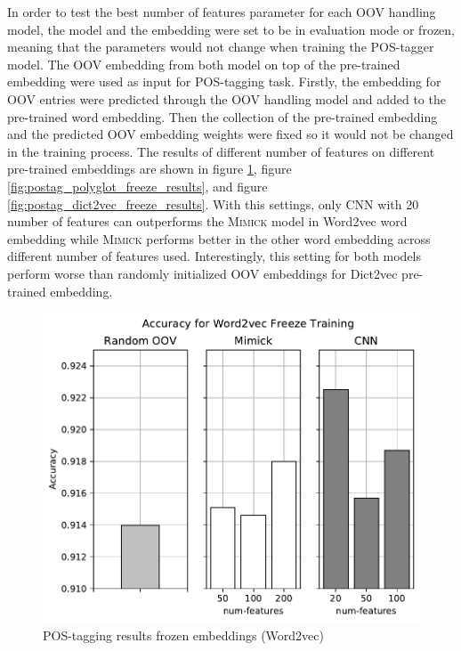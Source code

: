       In order to test the best number of features parameter for each
      OOV handling model, the model and the embedding were set to be
      in evaluation mode or frozen, meaning that the parameters would
      not change when training the POS-tagger model. The OOV embedding
      from both model on top of the pre-trained embedding were used as
      input for POS-tagging task. Firstly, the embedding for OOV
      entries were predicted through the OOV handling model and added
      to the pre-trained word embedding. Then the collection of the
      pre-trained embedding and the predicted OOV embedding weights
      were fixed so it would not be changed in the training process.
      The results of different number of features on different
      pre-trained embeddings are shown in figure
      \ref{fig:postag_word2vec_freeze_results}, figure
      \ref{fig:postag_polyglot_freeze_results}, and figure
      \ref{fig:postag_dict2vec_freeze_results}. With this settings,
      only CNN with 20 number of features can outperforms the
      \textsc{Mimick} model in Word2vec word embedding while
      \textsc{Mimick} performs better in the other word embedding
      across different number of features used. Interestingly, this
      setting for both models perform worse than randomly initialized
      OOV embeddings for Dict2vec pre-trained embedding.
      \begin{figure}[H]
        \centering
        \includegraphics[width=0.8\linewidth]{images/freeze_word2vec.pdf}
        \caption{POS-tagging results frozen embeddings (Word2vec)}
        \label{fig:postag_word2vec_freeze_results}
      \end{figure}
